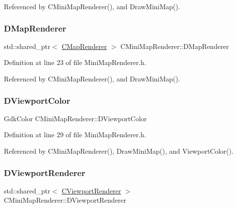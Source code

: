Referenced by C\+Mini\+Map\+Renderer(), and Draw\+Mini\+Map().

\hypertarget{classCMiniMapRenderer_a6656b208c6b29641a151ea4cbcfda31b}{}\label{classCMiniMapRenderer_a6656b208c6b29641a151ea4cbcfda31b} 
\subsubsection{\texorpdfstring{D\+Map\+Renderer}{DMapRenderer}}
{\footnotesize\ttfamily std\+::shared\+\_\+ptr$<$ \hyperlink{classCMapRenderer}{C\+Map\+Renderer} $>$ C\+Mini\+Map\+Renderer\+::\+D\+Map\+Renderer\hspace{0.3cm}{\ttfamily [protected]}}



Definition at line 23 of file Mini\+Map\+Renderer.\+h.



Referenced by C\+Mini\+Map\+Renderer(), and Draw\+Mini\+Map().

\hypertarget{classCMiniMapRenderer_a6a4f56052a4ced356448f5f1cc9a465e}{}\label{classCMiniMapRenderer_a6a4f56052a4ced356448f5f1cc9a465e} 
\subsubsection{\texorpdfstring{D\+Viewport\+Color}{DViewportColor}}
{\footnotesize\ttfamily Gdk\+Color C\+Mini\+Map\+Renderer\+::\+D\+Viewport\+Color\hspace{0.3cm}{\ttfamily [protected]}}



Definition at line 29 of file Mini\+Map\+Renderer.\+h.



Referenced by C\+Mini\+Map\+Renderer(), Draw\+Mini\+Map(), and Viewport\+Color().

\hypertarget{classCMiniMapRenderer_a36d2e3446baba2607129c673311d3420}{}\label{classCMiniMapRenderer_a36d2e3446baba2607129c673311d3420} 
\subsubsection{\texorpdfstring{D\+Viewport\+Renderer}{DViewportRenderer}}
{\footnotesize\ttfamily std\+::shared\+\_\+ptr$<$ \hyperlink{classCViewportRenderer}{C\+Viewport\+Renderer} $>$ C\+Mini\+Map\+Renderer\+::\+D\+Viewport\+Renderer\hspace{0.3cm}{\ttfamily [protected]}}



